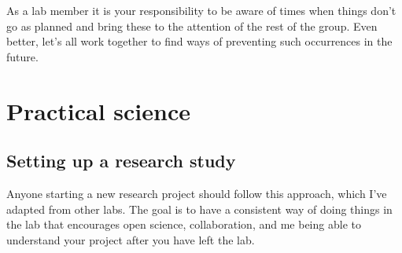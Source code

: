 \documentclass[letterpaper,12pt,oneside]{memoir}
\begin{document}
As a lab member it is your responsibility to be aware of times when things don't go as planned and bring these to the attention of the rest of the group. Even better, let's all work together to find ways of preventing such occurrences in the future.


\section{Practical science}

\subsection{Setting up a research study}

Anyone starting a new research project should follow this approach, which I've adapted from other labs. The goal is to have a consistent way of doing things in the lab that encourages open science, collaboration, and me being able to understand your project after you have left the lab.
\end{document}
